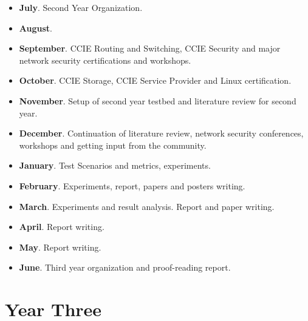 \documentclass[iwp,first]{luthesis}
\begin{document}
\begin{itemize}

	\item {\bf July}. Second Year Organization.

	\item {\bf August}.
 
	\item {\bf September}. CCIE Routing and Switching, CCIE Security and major network security certifications and workshops.

	\item {\bf October}. CCIE Storage, CCIE Service Provider and Linux certification.

	\item {\bf November}. Setup of second year testbed and literature review for second year.

	\item {\bf December}. Continuation of literature review, network security conferences, workshops and getting input from the community.

	\item {\bf January}. Test Scenarios and metrics, experiments.

	\item {\bf February}. Experiments, report, papers and posters writing.

	\item {\bf March}. Experiments and result analysis. Report and paper writing.

	\item {\bf April}. Report writing.

	\item {\bf May}. Report writing.

	\item {\bf June}. Third year organization and proof-reading report.

\end{itemize}



\section{Year Three}
\end{document}
